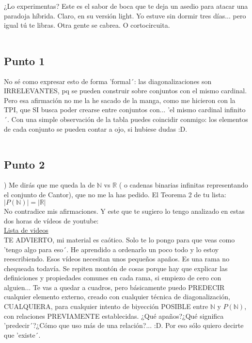 	\noindent
	¿Lo experimentas? Este es el sabor de boca que te deja un asedio para atacar una paradoja híbrida. Claro, en su versión light. Yo estuve sin dormir tres días... pero igual tú te libras. Otra gente se cabrea. O cortocircuita.\\\\
	
	\subsection{Punto 1}
	
	\noindent
	No sé como expresar esto de forma 'formal´: las diagonalizaciones son IRRELEVANTES, pq se pueden construir sobre conjuntos con el mismo cardinal. Pero esa afirmación no me la he sacado de la manga, como me hicieron con la TPI, que SI busca poder crearse entre conjuntos con... 'el mismo cardinal infinito´. Con una simple observación de la tabla puedes coincidir conmigo: los elementos de cada conjunto se pueden contar a ojo, si hubiese dudas :D.\\\\
	
	\subsection{Punto 2}
	
	) Me dirás que me queda la de $\mathbb{N}$ vs $\mathbb{R}$ ( o cadenas binarias infinitas representando el conjunto de Cantor), que no me la has pedido. El Teorema 2 de tu lista:\\
	$|P(\mathbb{N})| = |\mathbb{R}|$\\
	No contradice mis afirmaciones. Y este que te sugiero lo tengo analizado en estas dos horas de vídeos de youtube:\\
	\href{https://www.youtube.com/watch?v=reRUUKGFXf0&list=PLcEv5UNDUdw68yFXf2kYGDZVyIGpCfGdy}{Lista de videos}\\
	TE ADVIERTO, mi material es caótico. Solo te lo pongo para que veas como 'tengo algo para eso´. He aprendido a ordenarlo un poco todo y lo estoy reescribiendo. Esos vídeos necesitan unos pequeños apaños. Es una rama no chequeada todavía. Se repiten montón de cosas porque hay que explicar las definiciones y propiedades comunes en cada rama, si empiezo de cero con alguien... Te vas a quedar a cuadros, pero básicamente puedo PREDECIR cualquier elemento externo, creado con cualquier técnica de diagonalización, CUALQUIERA, para cualquier intento de biyección POSIBLE entre $\mathbb{N}$ y $P(\mathbb{N})$, con relaciones PREVIAMENTE establecidas. ¿Qué apaños?¿Qué significa 'predecir´?¿Cómo que uso más de una relación?... :D. Por eso sólo quiero decirte que 'existe´.
	
